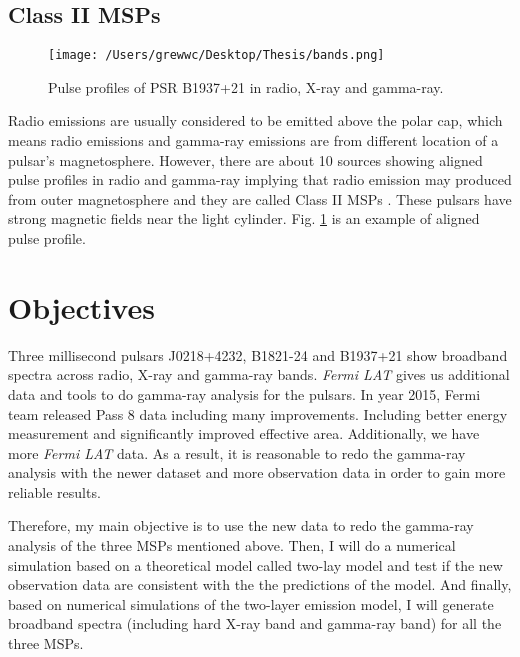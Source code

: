 \documentclass[12pt]{report}
\begin{document}
        \subsection{Class II MSPs}
          \begin{figure}[h]   
            \centering
            \texttt{[image: /Users/grewwc/Desktop/Thesis/bands.png]}
            \caption{Pulse profiles of PSR B1937+21 in radio, X-ray and gamma-ray.
              \protect \cite{0004-637X-787-2-167}}
            \label{fig:class }
          \end{figure}	 
          Radio emissions are usually considered to be emitted above the polar cap, which means
          radio emissions and gamma-ray emissions are from different location of a pulsar's 
          magnetosphere. However, there are about 10 sources showing aligned pulse profiles in 
          radio and gamma-ray implying that radio emission may produced from outer 
          magnetosphere and they are called Class II MSPs \cite{0004-637X-744-1-33}.
          These pulsars have strong magnetic fields near the light cylinder. 
          Fig. \ref{fig:class } is an example of aligned pulse profile.

      \section{Objectives}
        Three millisecond pulsars J0218+4232, B1821-24 and B1937+21 show 
        broadband spectra across radio, X-ray and gamma-ray bands. \textit{Fermi LAT} gives us 
        additional data and tools to do gamma-ray analysis for the pulsars. 
        In year 2015, Fermi team released Pass 8 data including many improvements. Including 
        better energy measurement and 
        significantly improved effective area. Additionally, we have more \textit{Fermi LAT}
        data. As a result, it is reasonable to redo the gamma-ray analysis with the newer 
        dataset and more observation data in order to gain more reliable results. 

        Therefore, my main objective is to use the new data to redo the gamma-ray
        analysis of the three MSPs mentioned above. 
        Then, I will do a numerical simulation based on a theoretical model called 
        two-lay model and test if the new observation data are consistent with the the 
        predictions of the model. And finally, based on numerical simulations of the 
        two-layer emission model, I will generate broadband spectra (including hard X-ray 
        band and gamma-ray band) for all the three MSPs. 
\end{document}
